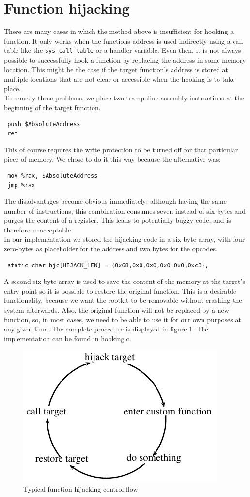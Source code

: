 \section{Function hijacking} \label{sec:hij}
There are many cases in which the method above is insufficient for hooking a 
function. It only works when the functions address is used indirectly using a 
call table like the \verb+sys_call_table+ or a handler variable. Even then, it 
is not always possible to successfully hook a function by replacing the address 
in some memory location. This might be the case if the target function's 
address is stored at multiple locations that are not clear or accessible when 
the hooking is to take place.
\\
To remedy these problems, we place two trampoline assembly instructions at the 
beginning of the target function.
\lstset{style=customasm}
\begin{lstlisting}
 push $AbsoluteAddress
 ret
\end{lstlisting}
This of course requires the write protection to be turned off for that 
particular piece of memory. We chose to do it this way because the alternative 
was:
\begin{lstlisting}
 mov %rax, $AbsoluteAddress
 jmp %rax
\end{lstlisting}
The disadvantages become obvious immediately: although having the same number 
of instructions, this combination consumes seven instead of six bytes and 
purges the content of a register. This leads to potentially 
buggy code, and is therefore unacceptable.\newline
\hfill\\
In our implementation we stored the hijacking code in a six byte array, with 
four zero-bytes as placeholder for the address and two bytes for the opcodes.
\lstset{style=customc}
\begin{lstlisting}
 static char hjc[HIJACK_LEN] = {0x68,0x0,0x0,0x0,0x0,0xc3};
\end{lstlisting}
A second six byte array is used to save the content of the memory at the 
target's entry point so it is possible to restore the original function.
This is a desirable functionality, because we want the rootkit to be removable 
without crashing the system afterwards. Also, the original function will not be 
replaced by a new function, so, in most cases, we need to be able to use it for 
our own purposes at any given time. The complete procedure is displayed in figure \ref{fig:control}.
The implementation can be found in hooking.c.
\begin{figure}[h!]
\centering
 \includegraphics{control_flow}
 \caption{Typical function hijacking control flow}
 \label{fig:control}
\end{figure}

